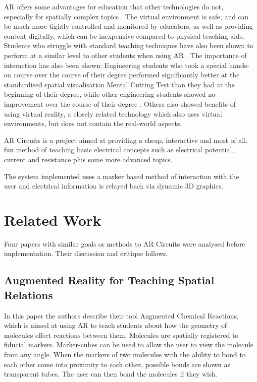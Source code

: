 AR offers some advantages for education that other technologies do not, especially for spatially complex topics \cite{Dunser2006}. The virtual environment is safe, and can be much more tightly controlled and monitored by educators, as well as providing content digitally, which can be inexpensive compared to physical teaching aids. Students who struggle with standard teaching techniques have also been shown to perform at a similar level to other students when using AR \cite{Dunser2008}. The importance of interaction has also been shown: Engineering students who took a special hands-on course over the course of their degree performed significantly better at the standardised spatial visualisation Mental Cutting Test than they had at the beginning of their degree, while other engineering students showed no improvement over the course of their degree \cite{Field1999}. Others \cite{Oman2000} also showed benefits of using virtual reality, a closely related technology which also uses virtual environments, but does not contain the real-world aspects.

AR Circuits is a project aimed at providing a cheap,
interactive and most of all, fun method of teaching basic electrical concepts
such as electrical potential, current and resistance plus some more advanced
topics.

The system implemented uses a marker based method of interaction with the user
and electrical information is relayed back via dynamic 3D graphics.

\section{Related Work}
Four papers with similar goals or methods to AR Circuits were analysed before
implementation. Their discussion and critique follows.

\subsection{Augmented Reality for Teaching Spatial Relations}
In this paper\cite{Maier09} the authors describe their tool Augmented Chemical Reactions, which is aimed at using AR to teach students about how the geometry of molecules effect reactions between them. Molecules are spatially registered to fiducial markers. Marker-cubes can be used to allow the user to view the molecule from any angle. When the markers of two molecules with the ability to bond to each other come into proximity to each other, possible bonds are shown as transparent tubes. The user can then bond the molecules if they wish.

